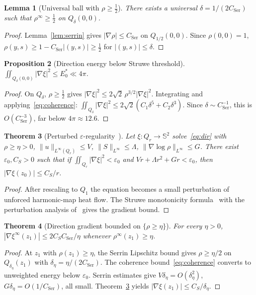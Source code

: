 \documentclass[12pt, reqno]{amsart}
\newtheorem{theorem}{Theorem}[section]
\newtheorem{lemma}[theorem]{Lemma}
\newtheorem{proposition}[theorem]{Proposition}
\theoremstyle{definition}
\theoremstyle{remark}
\numberwithin{equation}{section}
\newcommand{\Sbb}{\mathbb{S}}
\newcommand{\eps}{\varepsilon}
\begin{document}
\begin{lemma}[Universal ball with $\rho\ge\tfrac12$]\label{lem:rho-half}
There exists a universal $\delta=1/(2C_{\mathrm{Ser}})$ such that
$\rho^\infty\ge\tfrac12$ on $Q_\delta(0,0)$.
\end{lemma}
\begin{proof}
Lemma~\ref{lem:serrin} gives $|\nabla\rho|\le C_{\mathrm{Ser}}$ on
$Q_{1/2}(0,0)$.  Since $\rho(0,0)=1$,
$\rho(y,s)\ge 1-C_{\mathrm{Ser}}|(y,s)|\ge\tfrac12$ for $|(y,s)|\le\delta$.
\end{proof}

\begin{proposition}[Direction energy below Struwe threshold]%
\label{prop:below-Struwe}
$\iint_{Q_\delta(0,0)}|\nabla\xi|^2\le E_0^*\ll 4\pi$.
\end{proposition}
\begin{proof}
On $Q_\delta$, $\rho\ge\tfrac12$ gives
$|\nabla\xi|^2\le 2\sqrt{2}\,\rho^{3/2}|\nabla\xi|^2$.
Integrating and applying~\eqref{eq:coherence}:
$\iint_{Q_\delta}|\nabla\xi|^2\le 2\sqrt{2}(C_1\delta^5+C_2\delta^3)$.
Since $\delta\sim C_{\mathrm{Ser}}^{-1}$, this is $O(C_{\mathrm{Ser}}^{-3})$,
far below $4\pi\approx 12.6$.
\end{proof}

\begin{theorem}[Perturbed $\eps$-regularity~{\cite{Struwe1988,LinWang1998}}]%
\label{thm:struwe}
Let $\xi\colon Q_r\to\Sbb^2$ solve~\eqref{eq:dir} with
$\rho\ge\eta>0$, $\|u\|_{L^\infty(Q_r)}\le V$,
$\|S\|_{L^\infty}\le\Lambda$, $\|\nabla\log\rho\|_{L^\infty}\le G$.
There exist $\eps_0,C_S>0$ such that if
$\iint_{Q_r}|\nabla\xi|^2<\eps_0$ and $Vr+\Lambda r^2+Gr<\eps_0$,
then $|\nabla\xi(z_0)|\le C_S/r$.
\end{theorem}
\begin{proof}
After rescaling to $Q_1$ the equation becomes a small perturbation of
unforced harmonic-map heat flow.  The Struwe monotonicity
formula~\cite{Struwe1988} with the perturbation analysis
of~\cite{LinWang1998} gives the gradient bound.
\end{proof}

\begin{theorem}[Direction gradient bounded on $\{\rho\ge\eta\}$]%
\label{thm:dir-bound}
For every $\eta>0$,
$|\nabla\xi^\infty(z_1)|\le 2C_S C_{\mathrm{Ser}}/\eta$
whenever $\rho^\infty(z_1)\ge\eta$.
\end{theorem}
\begin{proof}
At $z_1$ with $\rho(z_1)\ge\eta$, the Serrin Lipschitz bound gives
$\rho\ge\eta/2$ on $Q_{\delta_\eta}(z_1)$ with
$\delta_\eta=\eta/(2C_{\mathrm{Ser}})$.
The coherence bound~\eqref{eq:coherence} converts to unweighted energy
below $\eps_0$.  Serrin estimates give $V\delta_\eta=O(\delta_\eta^2)$,
$G\delta_\eta=O(1/C_{\mathrm{Ser}})$, all small.
Theorem~\ref{thm:struwe} yields $|\nabla\xi(z_1)|\le C_S/\delta_\eta$.
\end{proof}
\end{document}
